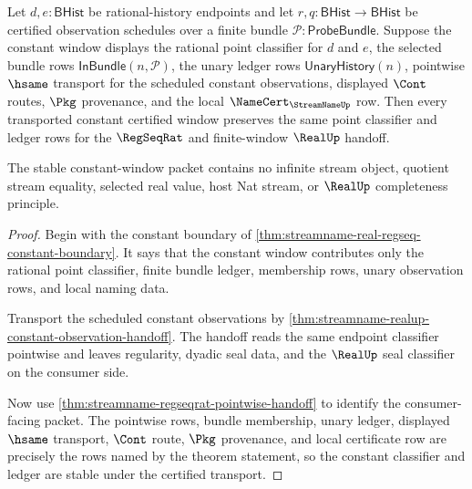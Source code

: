 \begin{theorem}
\label{thm:streamname-constant-window-classifier-stability}
Let $d,e:\mathsf{BHist}$ be rational-history endpoints and let
$r,q:\mathsf{BHist}\to\mathsf{BHist}$ be certified observation schedules over
a finite bundle $\mathcal{P}:\mathsf{ProbeBundle}$. Suppose the constant
window displays the rational point classifier for $d$ and $e$, the selected
bundle rows $\mathsf{InBundle}(n,\mathcal{P})$, the unary ledger rows
$\mathsf{UnaryHistory}(n)$, pointwise $\hsame$ transport for the scheduled
constant observations, displayed $\Cont$ routes, $\Pkg$ provenance, and the
local $\NameCert_{\StreamNameUp}$ row. Then every transported constant
certified window preserves the same point classifier and ledger rows for the
$\RegSeqRat$ and finite-window $\RealUp$ handoff.

The stable constant-window packet contains no infinite stream object,
quotient stream equality, selected real value, host Nat stream, or
$\RealUp$ completeness principle.
\end{theorem}
\begin{proof}
Begin with the constant boundary of
\autoref{thm:streamname-real-regseq-constant-boundary}. It says that the
constant window contributes only the rational point classifier, finite bundle
ledger, membership rows, unary observation rows, and local naming data.

Transport the scheduled constant observations by
\autoref{thm:streamname-realup-constant-observation-handoff}. The handoff
reads the same endpoint classifier pointwise and leaves regularity, dyadic
seal data, and the $\RealUp$ seal classifier on the consumer side.

Now use \autoref{thm:streamname-regseqrat-pointwise-handoff} to identify the
consumer-facing packet. The pointwise rows, bundle membership, unary ledger,
displayed $\hsame$ transport, $\Cont$ route, $\Pkg$ provenance, and local
certificate row are precisely the rows named by the theorem statement, so the
constant classifier and ledger are stable under the certified transport.
\end{proof}

